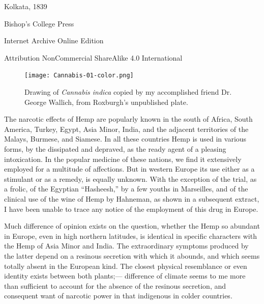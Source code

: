 \documentclass[a4paper, 11pt, oneside, polutonikogreek, english]{article}
\begin{document}
\begin{titlepage}
	
	
		
	\vspace*{\fill}%
	
	
	{Kolkata, 1839} %
 
        {\small Bishop's College Press}

	\vspace{1\baselineskip} %

        Internet Archive Online Edition  %
	
	{\small Attribution NonCommercial ShareAlike 4.0 International } %
\end{titlepage}
\clearpage
\setlength{\parskip}{1mm plus1mm minus1mm}
\tableofcontents
\clearpage
\begin{figure}[H]
\centering
\texttt{[image: Cannabis-01-color.png]}
\caption{Drawing of \emph{Cannabis indica} copied by my accomplished friend Dr. George Wallich, from Roxburgh's unpublished plate.}
\end{figure}
\clearpage
The narcotic effects of Hemp are popularly known in the south of Africa, South America, Turkey, Egypt, Asia Minor, India, and the adjacent territories of the Malays, Burmese, and Siamese. In all these countries Hemp is used in various forms, by the dissipated and depraved, as the ready agent of a pleasing intoxication. In the popular medicine of these nations, we find it extensively employed for a multitude of affections. But in western Europe its use either as a stimulant or as a remedy, is equally unknown. With the exception of the trial, as a frolic, of the Egyptian ``Hasheesh,'' by a few youths in Marseilles, and of the clinical use of the wine of Hemp by Hahneman, as shown in a subsequent extract, I have been unable to trace any notice of the employment of this drug in Europe.

Much difference of opinion exists on the question, whether the Hemp so abundant in Europe, even in high northern latitudes, is identical in specific characters with the Hemp of Asia Minor and India. The extraordinary symptoms produced by the latter depend on a resinous secretion with which it abounds, and which seems totally absent in the European kind. The closest physical resemblance or even identity exists between both plants;--- difference of climate seems to me more than sufficient to account for the absence of the resinous secretion, and consequent want of narcotic power in that indigenous in colder countries.
\end{document}
